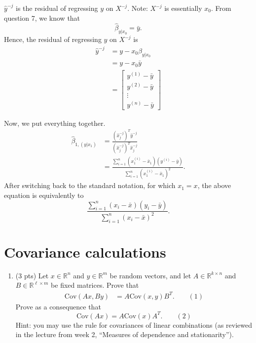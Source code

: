 \documentclass[
]{article}
\providecommand{\tightlist}{%
  \setlength{\itemsep}{0pt}\setlength{\parskip}{0pt}}
\begin{document}
\(\hat{y}^{-j}\) is the residual of regressing \(y\) on \(X^{-j}\).
Note: \(X^{-j}\) is essentially \(x_0\). From question 7, we know that
\[\hat{\beta}_{y|x_0} = \bar{y}.\] Hence, the residual of regressing
\(y\) on \(X^{-j}\) is \begin{align*}
    \hat{y}^{-j} & = y - x_0\hat{\beta}_{y|x_0} \\
    & = y - x_0\bar{y} \\
    & = \begin{bmatrix}
        y^{(1)} - \bar{y} \\
        y^{(2)} - \bar{y} \\
        \vdots \\
        y^{(n)} - \bar{y} 
    \end{bmatrix}
\end{align*}

Now, we put everything together. \begin{align*}
    \hat{\beta}_{1, (y|x_1)} & = \frac{\left(\hat{x}_j^{-j}\right)^T\hat{y}^{-j}}{\left(\hat{x}_j^{-j}\right)^T\hat{x}_j^{-j}} \\
    & = \frac{\sum_{i=1}^{n}\left(x_1^{(i)}-\bar{x}_1\right)\left(y^{(i)}-\bar{y}\right)}{\sum_{i=1}^{n}\left(x_1^{(i)} - \bar{x}_1\right)^2}.
\end{align*} After switching back to the standard notation, for which
\(x_1 = x\), the above equation is equivalently to
\[\frac{\sum_{i=1}^n (x_i - \bar{x}) (y_i - \bar{y})}{\sum_{i=1}^n (x_i - \bar{x})^2}.\]

\hypertarget{covariance-calculations}{%
\section{Covariance calculations}\label{covariance-calculations}}

\begin{enumerate}
\def\labelenumi{\arabic{enumi}.}
\setcounter{enumi}{8}
\tightlist
\item
  (3 pts) Let \(x \in \mathbb{R}^n\) and \(y \in \mathbb{R}^m\) be
  random vectors, and let \(A \in \mathbb{R}^{k \times n}\) and
  \(B \in \mathbb{R}^{\ell \times m}\) be fixed matrices. Prove that
  \begin{align}
  \mathrm{Cov}(Ax, By) & = A \mathrm{Cov}(x, y) B^T. \qquad (1)
  \end{align} Prove as a consequence that
  \[\mathrm{Cov}(Ax) = A \mathrm{Cov}(x) A^T.\qquad (2)\] Hint: you may
  use the rule for covariances of linear combinations (as reviewed in
  the lecture from week 2, ``Measures of dependence and stationarity'').
\end{enumerate}
\end{document}
